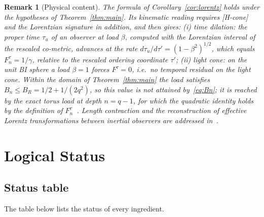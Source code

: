 \documentclass[11pt,a4paper]{article}
\newtheorem{remark}[theorem]{Remark}
\begin{document}
    \begin{remark}[Physical content]\label{rem:physics}
      The formula of Corollary~\ref{cor:lorentz} holds under the hypotheses of Theorem~\ref{thm:main}.
      Its kinematic reading requires \textup{[H-cone]} and the Lorentzian signature in addition, and then gives:
      (i) \emph{time dilation}: the proper time $\tau_u$ of an observer at load $\beta$, computed with the
      Lorentzian interval of the rescaled co-metric, advances at the rate $d\tau_u/d\tau' = (1-\beta^2)^{1/2}$, which
      equals $F_n^\tau = 1/\gamma$, relative to the rescaled ordering coordinate $\tau'$;
      (ii) \emph{light cone}: on the unit BI sphere a load $\beta = 1$ forces $F^\tau = 0$, i.e.\ no temporal
      residual on the light cone.
      Within the domain of Theorem~\ref{thm:main} the load satisfies $B_n \le B_R = 1/2 + 1/(2q^2)$, so this value
      is not attained by~\eqref{eq:Bn}; it is reached by the exact torus load at depth $n = q-1$, for which the
      quadratic identity holds by the definition of $F^\tau_n$~\cite{Beau2026lco3}.
      Length contraction and the reconstruction of effective Lorentz transformations between
      inertial observers are addressed in~\cite{Beau2026lco1}.
    \end{remark}

  \section{Logical Status}\label{sec:status}

    \subsection{Status table}

      The table below lists the status of every ingredient.
\end{document}

